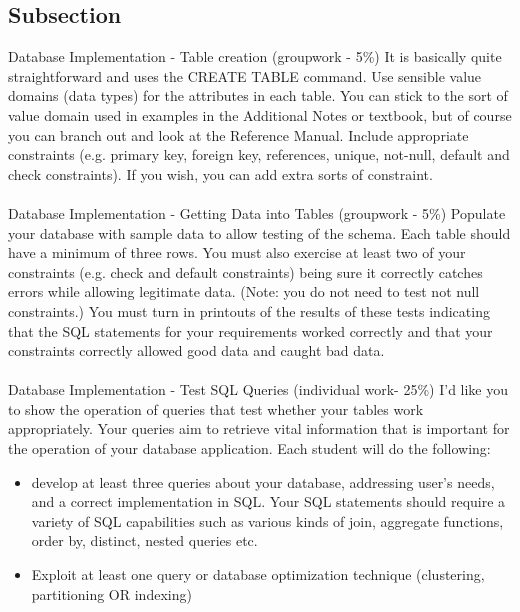 \subsection{Subsection}\label{subsection}
Database Implementation - Table creation (groupwork - 5\%) \newline
It is basically quite straightforward and uses the CREATE TABLE command.
Use sensible value domains (data types) for the attributes in each table. You can stick to the sort of value domain used in examples in the Additional Notes or textbook, but of course you can branch out and look at the Reference Manual. Include appropriate constraints (e.g. primary key, foreign key, references, unique, not-null, default and check constraints). If you wish, you can add extra sorts of constraint.
\\
\\
Database Implementation - Getting Data into Tables (groupwork - 5\%) \newline
Populate your database with sample data to allow testing of the schema. Each table should have a minimum of three rows. You must also exercise at least two of your constraints (e.g. check and default constraints) being sure it correctly catches errors while allowing legitimate data. (Note: you do not need to test not null constraints.) You must turn in printouts of the results of these tests indicating that the SQL statements for your requirements worked correctly and that your constraints correctly allowed good data and caught bad data.
\\
\\
Database Implementation - Test SQL Queries (individual work- 25\%) \newline
I'd like you to show the operation of queries that test whether your tables work appropriately. Your queries aim to retrieve vital information that is important for the operation of your database application.\newline
Each student will do the following:
\begin{itemize}
    \item develop at least three queries about your database, addressing user’s needs, and a correct implementation in SQL. Your SQL statements should require a variety of SQL capabilities such as various kinds of join, aggregate functions, order by, distinct, nested queries etc.
    \item Exploit at least one query or database optimization technique (clustering, partitioning OR indexing)
\end{itemize}
